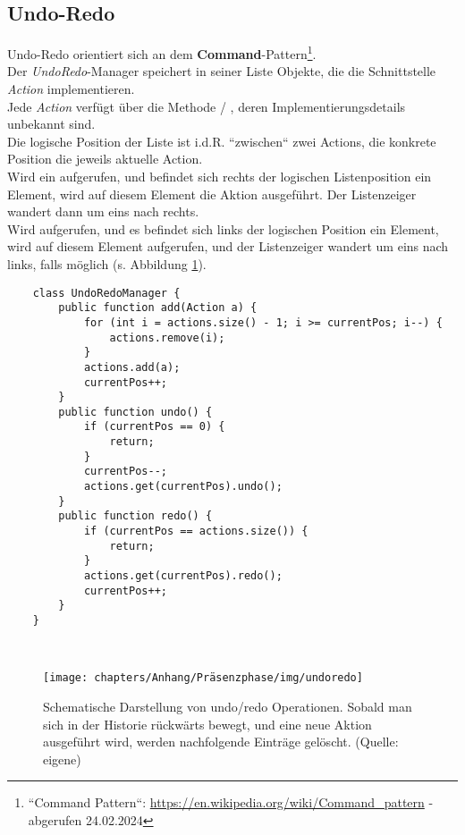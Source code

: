 \subsection*{Undo-Redo}

Undo-Redo orientiert sich an dem \textbf{Command}-Pattern\footnote{
    ``Command Pattern``: \url{https://en.wikipedia.org/wiki/Command_pattern} - abgerufen 24.02.2024
}.\\
Der \textit{UndoRedo}-Manager speichert in seiner Liste Objekte, die die Schnittstelle \textit{Action} implementieren.\\
Jede \textit{Action} verfügt über die Methode  / , deren Implementierungsdetails unbekannt sind.\\
Die logische Position der Liste ist i.d.R. ``zwischen`` zwei Actions, die konkrete Position die jeweils aktuelle Action.\\
Wird ein  aufgerufen, und befindet sich rechts der logischen Listenposition ein Element, wird auf diesem Element die Aktion  ausgeführt.
Der Listenzeiger wandert dann um eins nach rechts.\\
Wird  aufgerufen, und es befindet sich links der logischen Position ein Element, wird auf diesem Element  aufgerufen, und der Listenzeiger wandert um eins nach links, falls möglich (s. Abbildung \ref{fig:undoredo}).

\begin{verbatim}
    class UndoRedoManager {
        public function add(Action a) {
            for (int i = actions.size() - 1; i >= currentPos; i--) {
                actions.remove(i);
            }
            actions.add(a);
            currentPos++;
        }
        public function undo() {
            if (currentPos == 0) {
                return;
            }
            currentPos--;
            actions.get(currentPos).undo();
        }
        public function redo() {
            if (currentPos == actions.size()) {
                return;
            }
            actions.get(currentPos).redo();
            currentPos++;
        }
    }
\end{verbatim}\\

\begin{figure}
    \centering
    \texttt{[image: chapters/Anhang/Präsenzphase/img/undoredo]}
    \caption{Schematische Darstellung von undo/redo Operationen. Sobald man sich in der Historie rückwärts bewegt, und eine neue Aktion ausgeführt wird, werden nachfolgende Einträge gelöscht. (Quelle: eigene)}
    \label{fig:undoredo}
\end{figure}